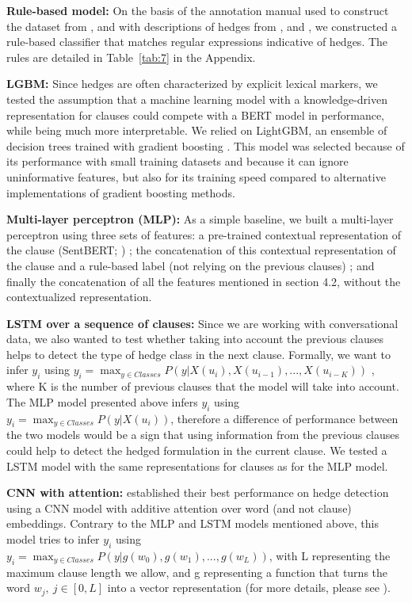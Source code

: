 \documentclass[11pt]{article}
\begin{document}
\noindent\textbf{Rule-based model:} On the basis of the annotation manual used to construct the dataset from \citet{Madaio2017}, and with descriptions of hedges from \citet{Rowland2007}, \citet{Fraser2010} and \citet{Brown1987}, we constructed a rule-based classifier that matches regular expressions indicative of hedges. The rules are detailed in Table~\ref{tab:7} in the Appendix. 

\noindent\textbf{LGBM:} Since hedges are often characterized by explicit lexical markers, we tested the assumption that a machine learning model with a knowledge-driven representation for clauses could compete with a BERT model in performance, while being much more interpretable. We relied on LightGBM, an ensemble of decision trees trained with gradient boosting \cite{Ke2017}. This model was selected because of its performance with small training datasets and because it can ignore uninformative features, but also for its training speed compared to alternative implementations of gradient boosting methods.

\noindent\textbf{Multi-layer perceptron (MLP):} As a simple baseline, we built a multi-layer perceptron using three sets of features: a pre-trained contextual representation of the clause (SentBERT; \citet{Reimers2019}) ; the concatenation of this contextual representation of the clause and a rule-based label (not relying on the previous clauses) ; and finally the concatenation of all the features mentioned in section 4.2, without the contextualized representation.

\noindent\textbf{LSTM over a sequence of clauses:} Since we are working with conversational data, we also wanted to test whether taking into account the previous clauses helps to detect the type of hedge class in the next clause.
\noindent Formally, we want to infer $y_{i}$ using $y_{i} = \max_{y \in Classes}P(y|X(u_{i}), X(u_{i-1}), ..., X(u_{i-K}))$ , where K is the number of previous clauses that the model will take into account. The MLP model presented above infers $y_{i}$ using $y_{i} = \max_{y \in Classes}P(y|X(u_{i}))$, therefore a difference of performance between the two models would be a sign that using information from the previous clauses could help to detect the hedged formulation in the current clause. 
\noindent We tested a LSTM model with the same representations for clauses as for the MLP model.

\noindent\textbf{CNN with attention:} \citet{Goel2019} established their best performance on hedge detection using a CNN model with additive attention over word (and not clause) embeddings. 
Contrary to the MLP and LSTM models mentioned above, this model tries to infer $y_{i}$ using $y_{i} = \max_{y \in Classes}P(y|g(w_{0}), g(w_{1}), ..., g(w_{L}))$, with L representing the maximum clause length we allow, and g representing a function that turns the word $w_{j},\ j \in [0, L]$ into a vector representation (for more details, please see \citet{Adel2017}).
\end{document}
